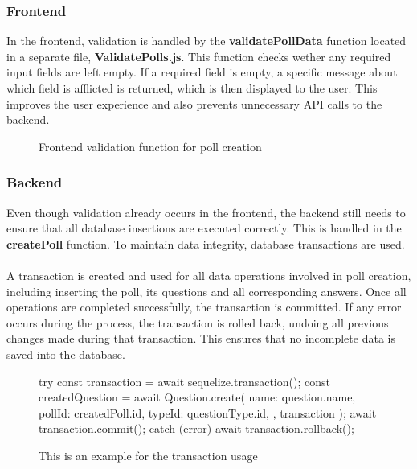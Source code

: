 \documentclass[a4paper,12pt]{report}
\begin{document}
\subsubsection{Frontend}
In the frontend, validation is handled by the \textbf{validatePollData} function located in a separate file, \textbf{ValidatePolls.js}. This function checks wether any required input fields are left empty. If a required field is empty, a specific message about which field is afflicted is returned, which is then displayed to the user. This improves the user experience and also prevents unnecessary API calls to the backend.
\begin{figure}[H]
	\caption{Frontend validation function for poll creation}
	\label{fig:beispielcode2}
\end{figure}

\subsubsection{Backend}
Even though validation already occurs in the frontend, the backend still needs to ensure that all database insertions are executed correctly. This is handled in the \textbf{createPoll} function. To maintain data integrity, database transactions are used.\\\\
A transaction is created and used for all data operations involved in poll creation, including inserting the poll, its questions and all corresponding answers. Once all operations are completed successfully, the transaction is committed. If any error occurs during the process, the transaction is rolled back, undoing all previous changes made during that transaction. This ensures that no incomplete data is saved into the database.
\begin{figure}[H]
	\begin{code}
		try {
			const transaction = await sequelize.transaction();
			const createdQuestion = await Question.create({
				name: question.name,
				pollId: createdPoll.id,
				typeId: questionType.id,
			}, { transaction });
			await transaction.commit();
		} catch (error) {
			await transaction.rollback();
		}
	\end{code}
	\caption{This is an example for the transaction usage}
	\label{fig:beispielcode2}
\end{figure} 
\end{document}
